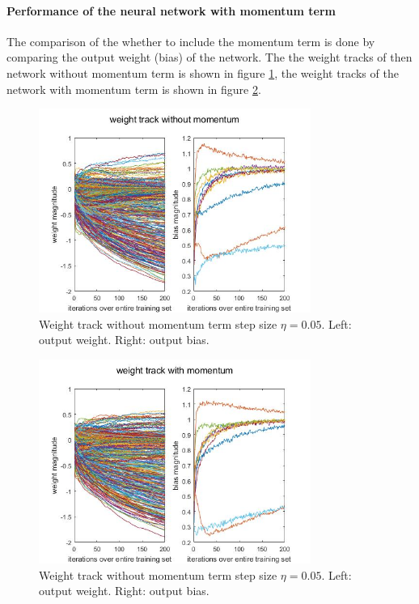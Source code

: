 \documentclass[conference]{IEEEtran}
\begin{document}
\paragraph{Performance of the neural network with momentum term} 
The comparison of the whether to include the momentum term is done by comparing the output weight (bias) of the network. The the weight tracks of then network without momentum term is shown in figure \ref{WTno}, the weight tracks of the network with momentum term is shown in figure \ref{WTM}.

\begin{figure}[h!]
\centerline{\includegraphics[width=3.5in]{noMeta0010.jpg}}
\caption{Weight track without momentum term step size $\eta = 0.05$. Left: output weight. Right: output bias.}
\label{WTno}
\end{figure}

\begin{figure}[h!]
\centerline{\includegraphics[width=3.5in]{Meta0010.jpg}}
\caption{Weight track without momentum term step size $\eta = 0.05$. Left: output weight. Right: output bias.}
\label{WTM}
\end{figure}
\end{document}
